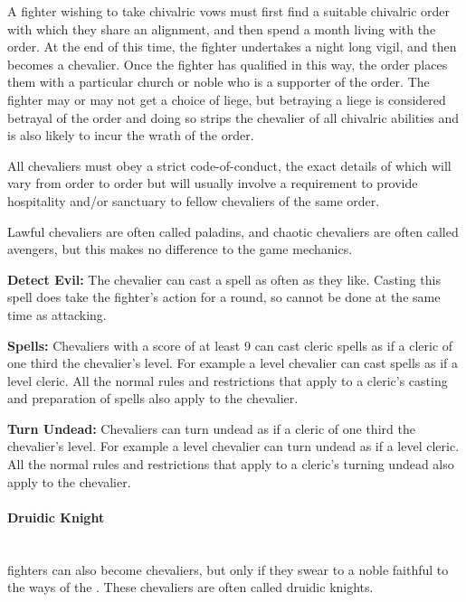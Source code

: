\begin{multicols*}{2}
A fighter wishing to take chivalric vows must first find a suitable chivalric order with which they share an alignment, and then spend a month living with the order. At the end of this time, the fighter undertakes a night long vigil, and then becomes a chevalier. Once the fighter has qualified in this way, the order places them with a particular church or noble who is a supporter of the order. The fighter may or may not get a choice of liege, but betraying a liege is considered betrayal of the order and doing so strips the chevalier of all chivalric abilities and is also likely to incur the wrath of the order.

All chevaliers must obey a strict code-of-conduct, the exact details of which will vary from order to order but will usually involve a requirement to provide hospitality and/or sanctuary to fellow chevaliers of the same order.

Lawful chevaliers are often called paladins, and chaotic chevaliers are often called avengers, but this makes no difference to the game mechanics.

\textbf{Detect Evil:} The chevalier can cast a  spell as often as they like. Casting this spell does take the fighter’s action for a round, so cannot be done at the same time as attacking.

\textbf{Spells:} Chevaliers with a  score of at least 9 can cast cleric spells as if a cleric of one third the chevalier’s level. For example a  level chevalier can cast spells as if a  level cleric. All the normal rules and restrictions that apply to a cleric’s casting and preparation of spells also apply to the chevalier.

\textbf{Turn Undead:} Chevaliers can turn undead as if a cleric of one third the chevalier’s level. For example a  level chevalier can turn undead as if a  level cleric. All the normal rules and restrictions that apply to a cleric’s turning undead also apply to the chevalier.

\paragraph{Druidic Knight}\mbox{}\\
 fighters can also become chevaliers, but only if they swear to a noble faithful to the ways of the . These chevaliers are often called druidic knights.


\end{multicols*}
